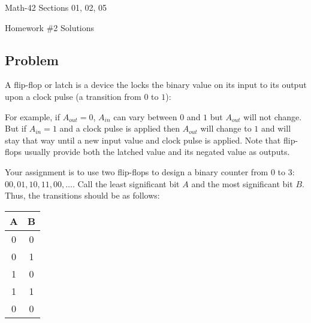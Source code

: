 \documentclass[letterpaper,12pt,fleqn]{article}
\begin{document}
\begin{center}
  \large
  Math-42 Sections 01, 02, 05

  \Large
  Homework \#2 Solutions
\end{center}

\subsection*{Problem}

A flip-flop or latch is a device the locks the binary value on its input to its output upon a clock pulse (a
transition from \(0\) to \(1\)):

\bigskip

\begin{center}
\end{center}

\bigskip

For example, if \(A_{out}=0\), \(A_{in}\) can vary between \(0\) and \(1\) but \(A_{out}\) will not change.  But if
\(A_{in}=1\) and a clock pulse is applied then \(A_{out}\) will change to \(1\) and will stay that way until a new
input value and clock pulse is applied.  Note that flip-flops usually provide both the latched value and its
negated value as outputs.

Your assignment is to use two flip-flops to design a binary counter from \(0\) to \(3\): \(00, 01, 10, 11, 00,
\ldots\).  Call the least significant bit \(A\) and the most significant bit \(B\).  Thus, the transitions should be
as follows:

\bigskip

\begin{center}
  \begin{tabular}{c|c}
    A & B \\
    \hline
    0 & 0 \\
    0 & 1 \\
    1 & 0 \\
    1 & 1 \\
    0 & 0
  \end{tabular}
\end{center}
\end{document}

